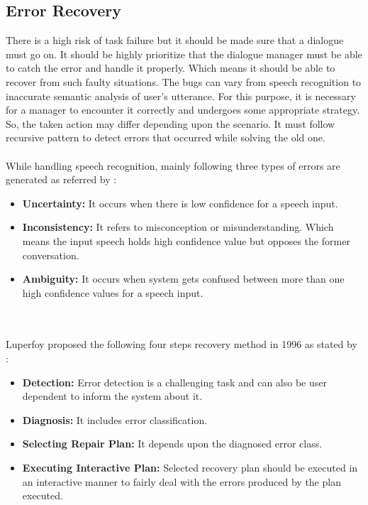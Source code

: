 \subsection{Error Recovery}
There is a high risk of task failure but it should be made sure that a dialogue must go on. It should be highly prioritize that the dialogue manager must be able to catch the error and handle it properly. Which means it should be able to recover from such faulty situations. The bugs can vary from speech recognition to inaccurate semantic analysis of user's utterance. For this purpose, it is necessary for a manager to encounter it correctly and undergoes some appropriate strategy. So, the taken action may differ depending upon the scenario. It must follow recursive pattern to detect errors that occurred while solving the old one. \cite{dialoguemanagementsystems}
\\~\\
While handling speech recognition, mainly following three types of errors are generated as referred by \cite{communicationaldeviation}\cite{pragmaticinterpretation}: 
\begin{itemize}
\item \textbf{Uncertainty:} It occurs when there is low confidence for a speech input.
\item \textbf{Inconsistency:} It refers to misconception or misunderstanding. Which means the input speech holds high confidence value but opposes the former conversation.       
\item \textbf{Ambiguity:} It occurs when system gets confused between more than one high confidence values for a speech input.
\end{itemize} 
\\~\\
Luperfoy proposed the following four steps recovery method in 1996 as stated by \cite{tutoringversustraining}\cite{dialoguemanagementsystems}: 
\begin{itemize}
\item \textbf{Detection:} Error detection is a challenging task and can also be user dependent to inform the system about it.
\item \textbf{Diagnosis:} It includes error classification.       
\item \textbf{Selecting Repair Plan:} It depends upon the diagnosed error class.
\item \textbf{Executing Interactive Plan:} Selected recovery plan should be executed in an interactive manner to fairly deal with the errors produced by the plan executed.
\end{itemize}

